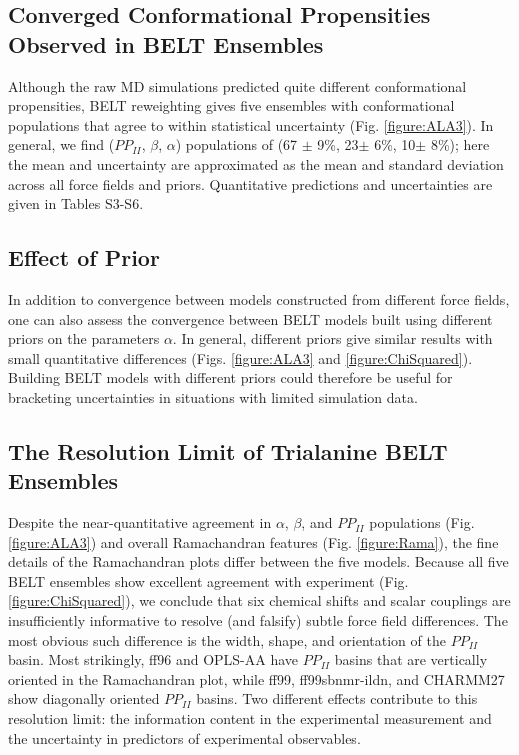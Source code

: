 \documentclass[journal=jacsat,manuscript=article]{achemso}
\begin{document}
\subsection*{Converged Conformational Propensities Observed in BELT Ensembles}

Although the raw MD simulations predicted quite different conformational propensities, BELT reweighting gives five ensembles with conformational populations that agree to within statistical uncertainty (Fig. \ref{figure:ALA3}).  In general, we find ($PP_{II}$, $\beta$, $\alpha$) populations of (67 $\pm$ 9\%, 23$\pm$ 6\%, 10$\pm$ 8\%); here the mean and uncertainty are approximated as the mean and standard deviation across all force fields and priors.  Quantitative predictions and uncertainties are given in Tables S3-S6.  

\subsection*{Effect of Prior}

In addition to convergence between models constructed from different force fields, one can also assess the convergence between BELT models built using different priors on the parameters $\alpha$.  In general, different priors give similar results with small quantitative differences (Figs. \ref{figure:ALA3} and \ref{figure:ChiSquared}).  Building BELT models with different priors could therefore be useful for bracketing uncertainties in situations with limited simulation data.  

\subsection*{The Resolution Limit of Trialanine BELT Ensembles}

Despite the near-quantitative agreement in $\alpha$, $\beta$, and $PP_{II}$ populations (Fig. \ref{figure:ALA3}) and overall Ramachandran features (Fig. \ref{figure:Rama}), the fine details of the Ramachandran plots differ between the five models.  Because all five BELT ensembles show excellent agreement with experiment (Fig. \ref{figure:ChiSquared}), we conclude that six chemical shifts and scalar couplings are insufficiently informative to resolve (and falsify) subtle force field differences.  The most obvious such difference is the width, shape, and orientation of the $PP_{II}$ basin.  Most strikingly, ff96 and OPLS-AA have $PP_{II}$ basins that are vertically oriented in the Ramachandran plot, while ff99, ff99sbnmr-ildn, and CHARMM27 show diagonally oriented $PP_{II}$ basins.  Two different effects contribute to this resolution limit: the information content in the experimental measurement and the uncertainty in predictors of experimental observables.
\end{document}

